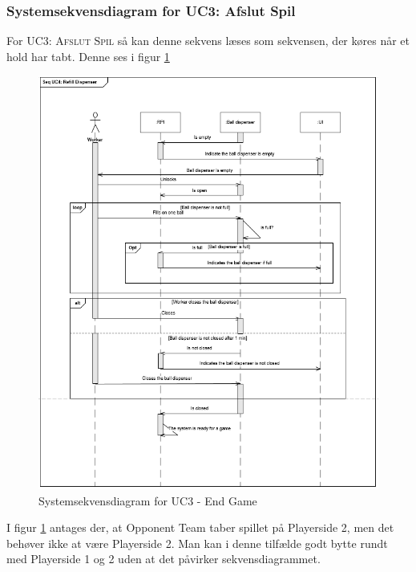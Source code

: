 \documentclass[Rapport/Rapport_main.tex]{subfiles}
\begin{document}
\subsubsection{Systemsekvensdiagram for UC3: Afslut Spil}
For \textsc{UC3: Afslut Spil} så kan denne sekvens læses som sekvensen, der køres når et hold har tabt. Denne ses i figur \ref{fig:rap_sd_UC3}
\begin{figure}
    \centering 
    \includegraphics[width=\linewidth]{Arkitektur/Sekvensdiagrammer/graphics/sd_UC2.png}
    \caption{Systemsekvensdiagram for UC3 - End Game}
    \label{fig:rap_sd_UC3}
\end{figure}
I figur \ref{fig:rap_sd_UC3} antages der, at Opponent Team taber spillet på Playerside 2, men det behøver ikke at være Playerside 2. Man kan i denne tilfælde godt bytte rundt med Playerside 1 og 2 uden at det påvirker sekvensdiagrammet.
\end{document}
